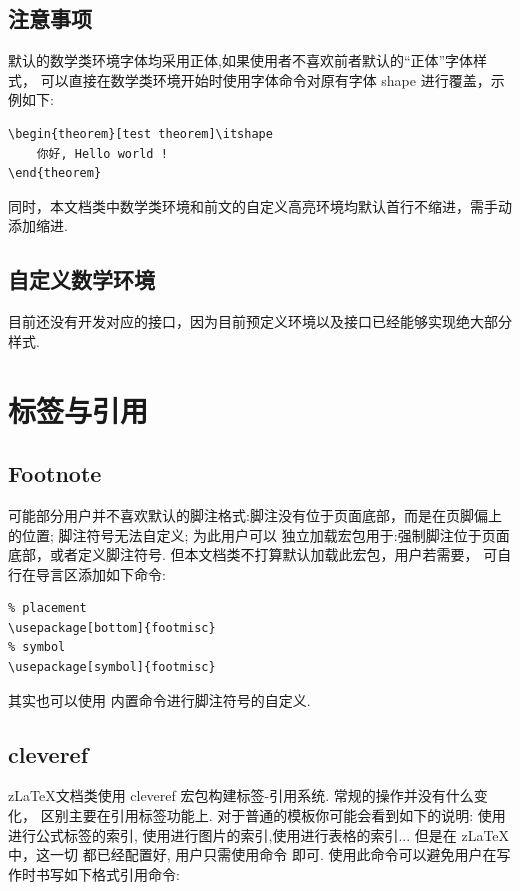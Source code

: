 \subsection{注意事项}
默认的数学类环境字体均采用正体\cmd[F]{\upshape},如果使用者不喜欢前者默认的``正体''字体样式，
可以直接在数学类环境开始时使用字体命令\cmd[F]{\itshape}对原有字体 shape 进行覆盖，示例如下:

\begin{verbatim}
\begin{theorem}[test theorem]\itshape
    你好, Hello world !
\end{theorem}
\end{verbatim}

\begin{remark}\itshape
    \boomen \par 
    \boomcn
\end{remark}

同时，本文档类中数学类环境和前文的自定义高亮环境\cmd{\zlatexFramed}均默认首行不缩进，需手动添加缩进.

\subsection{自定义数学环境}
目前还没有开发对应的接口，因为目前预定义环境以及接口已经能够实现绝大部分样式. 


\section{标签与引用}\label{标签与引用}
\subsection{Footnote}
可能部分用户并不喜欢默认的脚注格式:脚注没有位于页面底部，而是在页脚偏上的位置; 脚注符号无法自定义; 为此用户可以
独立加载宏包用于:强制脚注位于页面底部，或者定义脚注符号. 但本文档类不打算默认加载此宏包，用户若需要，
可自行在导言区添加如下命令:

\begin{verbatim}
% placement
\usepackage[bottom]{footmisc}
% symbol 
\usepackage[symbol]{footmisc}
\end{verbatim}

其实也可以使用  内置命令\cmd[F]{\fnsymbol}进行脚注符号的自定义.

\subsection{cleveref}
z\LaTeX{}文档类使用 {cleveref} 宏包构建标签-引用系统. 常规的\cmd[F]{\label{}}操作并没有什么变化，
区别主要在引用标签功能上. 对于普通的模板你可能会看到如下的说明: 使用\cmd[F]{\eqref}进行公式标签的索引,
使用\cmd[F]{\figref}进行图片的索引,使用\cmd[F]{\tabref}进行表格的索引... 但是在 z\LaTeX{} 中，这一切
都已经配置好, 用户只需使用命令 \cmd{\cref} 即可. 使用此命令可以避免用户在写作时书写如下格式引用命令:

